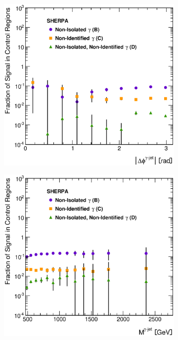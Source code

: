 \documentclass[12pt, twoside]{article}
\numberwithin{equation}{section}
\numberwithin{figure}{section}
\newenvironment{changemargin}[2]{%
\begin{list}{}{%
\setlength{\topsep}{0pt}%
\setlength{\leftmargin}{#1}%
\setlength{\rightmargin}{#2}%
\setlength{\listparindent}{\parindent}%
\setlength{\itemindent}{\parindent}%
\setlength{\parsep}{\parskip}%
}%
\item[]}{\end{list}}
\begin{document}
\begin{figure}
\begin{changemargin}{-1.0cm}{-0.75cm}
\begin{changemargin}{-0.75cm}{-1.0cm}
        \vspace{0.2cm}
        \begin{subfigure}[b]{0.37\textwidth}
            \includegraphics[width=\textwidth]{./images/SignalLeakageFractionsSherpa/SLF-107.eps}
            \subcaption{}
            \label{fig:SLFDeltaPhiPhotonJet}
        \end{subfigure}
        \begin{subfigure}[b]{0.37\textwidth}
            \includegraphics[width=\textwidth]{./images/SignalLeakageFractionsSherpa/SLF-108.eps}

\end{subfigure}
\end{changemargin}
\end{changemargin}
\end{figure}
\end{document}
